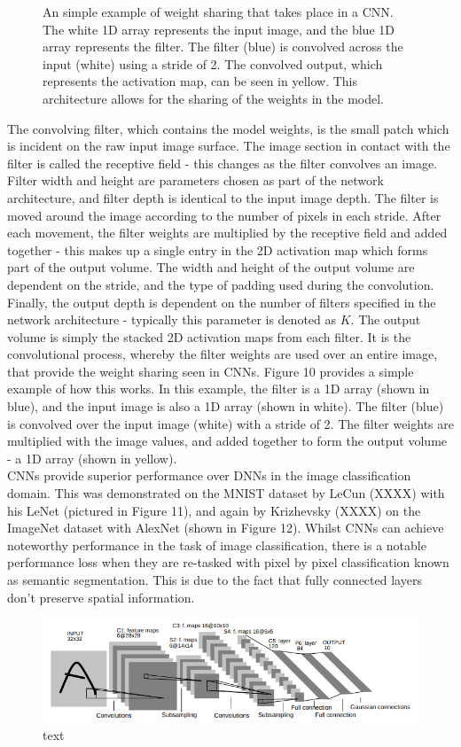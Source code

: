 \documentclass[a4paper]{article}
\begin{document}
\begin{figure}[h]
\begin{minipage}{0.45\textwidth}
\caption{An simple example of weight sharing that takes place in a CNN. The white 1D array represents the input image, and the blue 1D array represents the filter. The filter (blue) is convolved across the input (white) using a stride of 2. The convolved output, which represents the activation map, can be seen in yellow. This architecture allows for the sharing of the weights in the model.}
\end{minipage}
\end{figure}

The convolving filter, which contains the model weights, is the small patch which is incident on the raw input image surface. The image section in contact with the filter is called the receptive field - this changes as the filter convolves an image. Filter width and height are parameters chosen as part of the network architecture, and filter depth is identical to the input image depth. The filter is moved around the image according to the number of pixels in each stride. After each movement, the filter weights are multiplied by the receptive field and added together - this makes up a single entry in the 2D activation map which forms part of the output volume. The width and height of the output volume are dependent on the stride, and the type of padding used during the convolution. Finally, the output depth is dependent on the number of filters specified in the network architecture - typically this parameter is denoted as $K$. The output volume is simply the stacked 2D activation maps from each filter. It is the convolutional process, whereby the filter weights are used over an entire image, that provide the weight sharing seen in CNNs. Figure 10 provides a simple example of how this works. In this example, the filter is a 1D array (shown in blue), and the input image is also a 1D array (shown in white). The filter (blue) is convolved over the input image (white) with a stride of 2. The filter weights are multiplied with the image values, and added together to form the output volume - a 1D array (shown in yellow).\\

CNNs provide superior performance over DNNs in the image classification domain. This was demonstrated on the MNIST dataset by LeCun (XXXX) with his LeNet (pictured in Figure 11), and again by Krizhevsky (XXXX) on the ImageNet dataset with AlexNet (shown in Figure 12). Whilst CNNs can achieve noteworthy performance in the task of image classification, there is a notable performance loss when they are re-tasked with pixel by pixel classification known as semantic segmentation. This is due to the fact that fully connected layers don't preserve spatial information.
\begin{figure}[h]
\centering
\includegraphics[scale=0.45]{lenet5}
\caption{text}
\end{figure}
\end{document}
